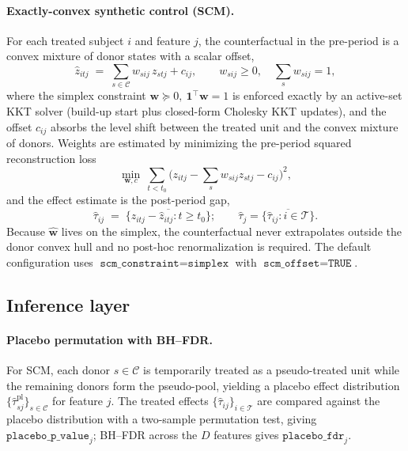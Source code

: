 \documentclass[11pt]{article}
\begin{document}
\paragraph{Exactly-convex synthetic control (SCM).}\label{sec:scm}
For each treated subject $i$ and feature $j$, the counterfactual in the pre-period is a convex
mixture of donor states with a scalar offset,
\begin{equation}\label{eq:scm}
\hat z_{itj} \;=\; \sum_{s\in\mathcal{C}} w_{sij}\, z_{stj} + c_{ij},
\qquad
w_{sij}\ge 0,\quad \sum_{s} w_{sij} = 1,
\end{equation}
where the simplex constraint $\mathbf{w}\succeq 0,\ \mathbf{1}^\top\mathbf{w}=1$ is enforced
exactly by an active-set KKT solver (build-up start plus closed-form
Cholesky KKT updates), and the offset $c_{ij}$ absorbs the level shift between the
treated unit and the convex mixture of donors. Weights are estimated by minimizing the pre-period
squared reconstruction loss
\begin{equation}\label{eq:scmobj}
\min_{\mathbf{w},c}\ \sum_{t<t_0}\Big(z_{itj} - \sum_{s}w_{sij}z_{stj} - c_{ij}\Big)^2,
\end{equation}
and the effect estimate is the post-period gap,
\begin{equation}\label{eq:effect}
\hat\tau_{ij} \;=\; \overline{\big\{ z_{itj} - \hat z_{itj} : t \ge t_0 \big\}};
\qquad
\hat\tau_j = \overline{\{\hat\tau_{ij}: i\in\mathcal{T}\}}.
\end{equation}
Because $\hat{\mathbf w}$ lives on the simplex, the counterfactual never extrapolates outside the
donor convex hull and no post-hoc renormalization is required. The default configuration uses
$\texttt{scm\_constraint}=\texttt{simplex}$ with $\texttt{scm\_offset}=\texttt{TRUE}$.

\subsection{Inference layer}\label{sec:inference}

\paragraph{Placebo permutation with BH--FDR.}
For SCM, each donor $s\in\mathcal{C}$ is temporarily treated as a pseudo-treated unit while the
remaining donors form the pseudo-pool, yielding a placebo effect distribution
$\{\hat\tau_{sj}^{\mathrm{pl}}\}_{s\in\mathcal{C}}$ for feature $j$. The treated effects
$\{\hat\tau_{ij}\}_{i\in\mathcal{T}}$ are compared against the placebo distribution with a
two-sample permutation test, giving $\texttt{placebo\_p\_value}_{j}$; BH--FDR across the $D$
features gives $\texttt{placebo\_fdr}_{j}$.
\end{document}
